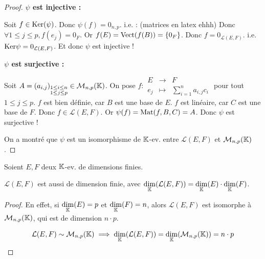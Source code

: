 \documentclass[12pt, a4paper]{report}
\begin{document}
\begin{proof}
    \textbf{$\psi$ est injective :}

    \begin{outline}
    \1 Soit $f \in \mathrm{Ker}(\psi)$. Donc $\psi(f) = 0_{n,p}$.
    \2 i.e. : (matrices en latex ehhh)
    \1 Donc $\forall 1 \le j \le p, f(e_j) = 0_F$.
    \1 Or $f(E) = \mathrm{Vect}(f(B)) = \{0_F\}$.
    \1 Donc $f = 0_{\mathcal L(E,F)}$.
    \1 i.e. $\mathrm{Ker}\psi = 0_{\mathcal L(E,F)}$.
    \1 Et donc $\psi$ est injective !
    \end{outline}

    \textbf{$\psi$ est surjective :}

    \begin{outline}
        \1 Soit $A = (a_{i,j})_{\substack{1 \le i \le n\\ 1 \le j \le p}} \in \mathcal M_{n,p}(\mathbb{K})$.
        \1 On pose $f : \begin{matrix} E &\to &F \\ e_j &\mapsto &\sum_{i=1}^n a_{i,j} c_i \end{matrix}$ pour tout $1 \le j \le p$.
        \1 $f$ est bien définie, car $B$ est une base de $E$.
        \1 $f$ est linéaire, car $C$ est une base de $F$.
        \1 Donc $f \in \mathcal L(E,F)$.
        \1 Or $\psi(f) = \mathrm{Mat}(f,B,C) = A$.
        \1 Donc $\psi$ est surjective !
    \end{outline}

    On a montré que $\psi$ est un isomorphisme de $\mathbb{K}$-ev. entre $\mathcal L(E,F)$ et $\mathcal M_{n,p}(\mathbb{K})$.
\end{proof}


\begin{consequence}
    Soient $E,F$ deux $\mathbb{K}$-ev. de dimensions finies.

    $\mathcal L(E,F)$ est aussi de dimension finie, avec $\underset{\mathbb{K}}\dim(\mathcal L(E,F)) = \underset{\mathbb{K}}\dim(E) \cdot \underset{\mathbb{K}}\dim(F)$.
\end{consequence}

\begin{proof}
    En effet, si $\underset{\mathbb{K}}\dim(E) = p$ et $\underset{\mathbb{K}}\dim(F) = n$, alors $\mathcal L(E,F)$ est isomorphe à $\mathcal M_{n,p}(\mathbb{K})$, qui est de dimension $n \cdot p$.

    $$\mathcal L(E,F) \sim \mathcal M_{n,p}(\mathbb{K}) \implies \underset{\mathbb{K}}\dim(\mathcal L(E,F)) = \underset{\mathbb{K}}\dim(\mathcal M_{n,p}(\mathbb{K})) = n \cdot p$$
\end{proof}
\end{document}

